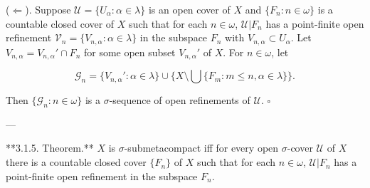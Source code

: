 \documentclass[main.tex]{subfiles}
\begin{document}
($\Leftarrow$). Suppose $\mathscr{U} = \{U_\alpha : \alpha \in \lambda\}$ is an open cover of $X$ and $\{F_n : n \in \omega\}$ is a countable closed cover of $X$ such that for each $n \in \omega$, $\mathscr{U} \vert{} F_n$ has a point-finite open refinement $\mathscr{V}_n = \{V_{n,\alpha} : \alpha \in \lambda\}$ in the subspace $F_n$ with $V_{n,\alpha} \subset U_\alpha$. Let $V_{n,\alpha} = V_{n,\alpha}' \cap F_n$ for some open subset $V_{n,\alpha}'$ of $X$. For $n \in \omega$, let


$$\mathscr{G}_n = \{V_{n,\alpha}' : \alpha \in \lambda\} \cup \{X \setminus \bigcup \{F_m : m \le n, \alpha \in \lambda\}\}.$$

Then $\{\mathscr{G}_n : n \in \omega\}$ is a $\sigma$-sequence of open refinements of $\mathscr{U}$. $\square$

---

**3.1.5. Theorem.** $X$ is $\sigma$-submetacompact iff for every open $\sigma$-cover $\mathscr{U}$ of $X$ there is a countable closed cover $\{F_n\}$ of $X$ such that for each $n \in \omega$, $\mathscr{U} \vert{} F_n$ has a point-finite open refinement in the subspace $F_n$.




\end{document}

